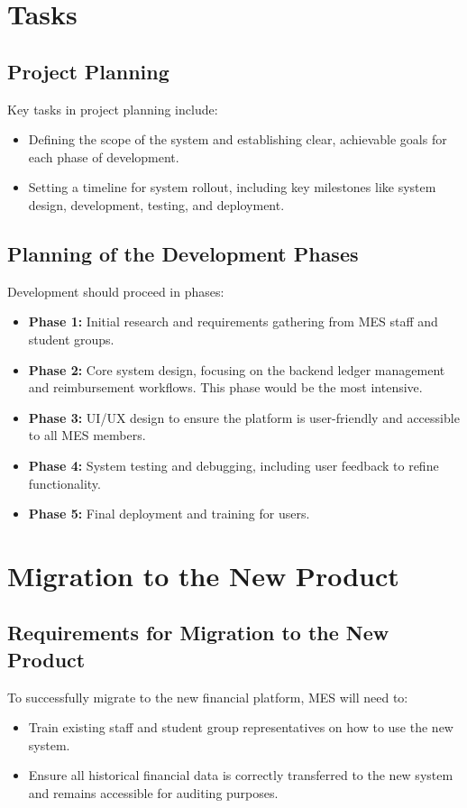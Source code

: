\documentclass[12pt]{article}
\begin{document}
\section{Tasks}
\subsection{Project Planning}
Key tasks in project planning include:
\begin{itemize}
    \item Defining the scope of the system and establishing clear, achievable goals for each phase of development.
    \item Setting a timeline for system rollout, including key milestones like system design, development, testing, and deployment.
\end{itemize}

\subsection{Planning of the Development Phases}
Development should proceed in phases:
\begin{itemize}
    \item \textbf{Phase 1:} Initial research and requirements gathering from MES staff and student groups.
    \item \textbf{Phase 2:} Core system design, focusing on the backend ledger management and reimbursement workflows. This phase would be the most intensive.
    \item \textbf{Phase 3:} UI/UX design to ensure the platform is user-friendly and accessible to all MES members.
    \item \textbf{Phase 4:} System testing and debugging, including user feedback to refine functionality.
    \item \textbf{Phase 5:} Final deployment and training for users.
\end{itemize}

\section{Migration to the New Product}
\subsection{Requirements for Migration to the New Product}
To successfully migrate to the new financial platform, MES will need to:
\begin{itemize}
    \item Train existing staff and student group representatives on how to use the new system.
    \item Ensure all historical financial data is correctly transferred to the new system and remains accessible for auditing purposes.
\end{itemize}
\end{document}
